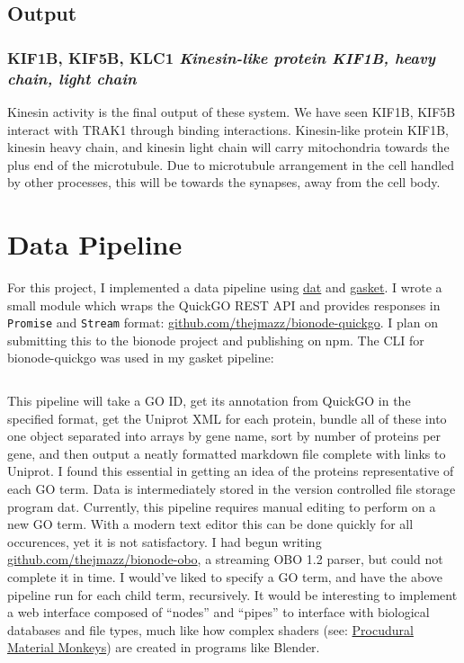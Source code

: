 \subsection{Output}

\subsubsection{KIF1B, KIF5B, KLC1 \textit{Kinesin-like protein KIF1B, heavy chain, light chain}}

Kinesin activity is the final output of these system. We have seen KIF1B, KIF5B
interact with TRAK1 through binding interactions. Kinesin-like protein KIF1B,
kinesin heavy chain, and kinesin light chain will carry mitochondria towards
the plus end of the microtubule. Due to microtubule arrangement in the cell
handled by other processes, this will be towards the synapses, away from the
cell body.

\section{Data Pipeline}

For this project, I implemented a data pipeline using
\href{http://dat-data.com}{dat} and
\href{https://github.com/datproject/gasket}{gasket}. I wrote a small module
which wraps the QuickGO REST API and provides responses in \texttt{Promise} and
\texttt{Stream} format:
\href{https://github.com/thejmazz/bionode-quickgo}{github.com/thejmazz/bionode-quickgo}.
I plan on submitting this to the bionode project and publishing on npm. The CLI
for bionode-quickgo was used in my gasket pipeline:

\inputminted[fontsize=\small]{json}{"../gasket.json"}

This pipeline will take a GO ID, get its annotation from QuickGO in the
specified format, get the Uniprot XML for each protein, bundle all of these into
one object separated into arrays by gene name, sort by number of proteins per
gene, and then output a neatly formatted markdown file complete with links to
Uniprot. I found this essential in getting an idea of the proteins
representative of each GO term. Data is intermediately stored in the version
controlled file storage program dat. Currently, this pipeline requires manual
editing to perform on a new GO term. With a modern text editor this can be done
quickly for all occurences, yet it is not satisfactory. I had begun writing
\href{https://github.com/thejmazz/bionode-obo}{github.com/thejmazz/bionode-obo},
a streaming OBO 1.2 parser, but could not complete it in time. I would've liked
to specify a GO term, and have the above pipeline run for each child term,
recursively. It would be interesting to implement a web interface composed of
``nodes'' and ``pipes'' to interface with biological databases and file types,
much like how complex shaders (see: \href{http://imgur.com/a/CQUIL}{Procudural
Material Monkeys}) are created in programs like Blender.





